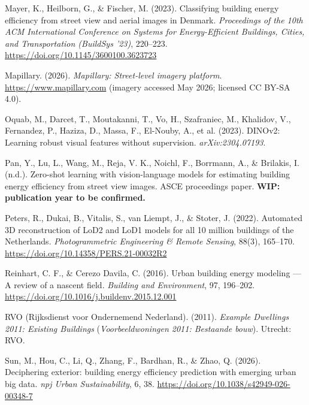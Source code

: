 \par\medskip
\noindent \hypertarget{ref:mayer2023dk}{}Mayer, K., Heilborn, G., \& Fischer, M. (2023). Classifying building energy efficiency from street view and aerial images in Denmark. \emph{Proceedings of the 10th ACM International Conference on Systems for Energy-Efficient Buildings, Cities, and Transportation (BuildSys '23)}, 220--223. \url{https://doi.org/10.1145/3600100.3623723}
\par\medskip
\noindent \hypertarget{ref:mapillary2026}{}Mapillary. (2026). \emph{Mapillary: Street-level imagery platform}. \url{https://www.mapillary.com} (imagery accessed May 2026; licensed CC BY-SA 4.0).
\par\medskip
\noindent \hypertarget{ref:oquab2023}{}Oquab, M., Darcet, T., Moutakanni, T., Vo, H., Szafraniec, M., Khalidov, V., Fernandez, P., Haziza, D., Massa, F., El-Nouby, A., et al. (2023). DINOv2: Learning robust visual features without supervision. \emph{arXiv:2304.07193}.
\par\medskip
\noindent \hypertarget{ref:pan}{}Pan, Y., Lu, L., Wang, M., Reja, V. K., Noichl, F., Borrmann, A., \& Brilakis, I. (n.d.). Zero-shot learning with vision-language models for estimating building energy efficiency from street view images. ASCE proceedings paper. \textbf{WIP: publication year to be confirmed.}
\par\medskip
\noindent \hypertarget{ref:peters2022}{}Peters, R., Dukai, B., Vitalis, S., van Liempt, J., \& Stoter, J. (2022). Automated 3D reconstruction of LoD2 and LoD1 models for all 10 million buildings of the Netherlands. \emph{Photogrammetric Engineering \& Remote Sensing}, 88(3), 165--170. \url{https://doi.org/10.14358/PERS.21-00032R2}
\par\medskip
\noindent \hypertarget{ref:reinhart2016}{}Reinhart, C. F., \& Cerezo Davila, C. (2016). Urban building energy modeling --- A review of a nascent field. \emph{Building and Environment}, 97, 196--202. \url{https://doi.org/10.1016/j.buildenv.2015.12.001}
\par\medskip
\noindent \hypertarget{ref:rvo2011}{}RVO (Rijksdienst voor Ondernemend Nederland). (2011). \emph{Example Dwellings 2011: Existing Buildings} (\emph{Voorbeeldwoningen 2011: Bestaande bouw}). Utrecht: RVO.
\par\medskip
\noindent \hypertarget{ref:sun2026}{}Sun, M., Hou, C., Li, Q., Zhang, F., Bardhan, R., \& Zhao, Q. (2026). Deciphering exterior: building energy efficiency prediction with emerging urban big data. \emph{npj Urban Sustainability}, 6, 38. \url{https://doi.org/10.1038/s42949-026-00348-7}
